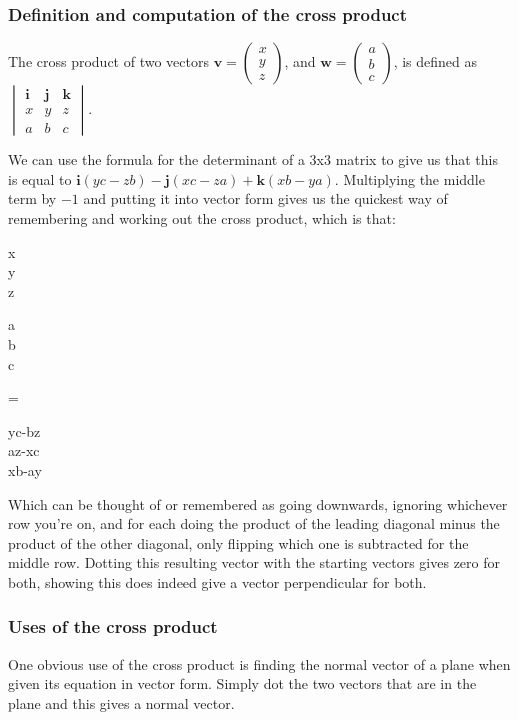 \subsubsection{Definition and computation of the cross product}
The cross product of two vectors $\mathbf{v}=\begin{pmatrix}x\\y\\z\end{pmatrix}$, and $\mathbf{w}=\begin{pmatrix}a\\b\\c\end{pmatrix}$, is defined as $\begin{vmatrix}\mathbf{i} & \mathbf{j} & \mathbf{k}\\x & y & z \\ a & b & c\end{vmatrix}$.

We can use the formula for the determinant of a 3x3 matrix to give us that this is equal to $\mathbf{i}(yc-zb)-\mathbf{j}(xc-za)+\mathbf{k}(xb-ya)$. Multiplying the middle term by $-1$ and putting it into vector form gives us the quickest way of remembering and working out the cross product, which is that:

\begin{ea}
	\begin{pmatrix}x\\y\\z\end{pmatrix} \times \begin{pmatrix}a\\b\\c\end{pmatrix}
	= \begin{pmatrix}yc-bz\\az-xc\\xb-ay\end{pmatrix}
\end{ea}

Which can be thought of or remembered as going downwards, ignoring whichever row you're on, and for each doing the product of the leading diagonal minus the product of the other diagonal, only flipping which one is subtracted for the middle row. Dotting this resulting vector with the starting vectors gives zero for both, showing this does indeed give a vector perpendicular for both.

\subsubsection{Uses of the cross product}
One obvious use of the cross product is finding the normal vector of a plane when given its equation in vector form. Simply dot the two vectors that are in the plane and this gives a normal vector.

